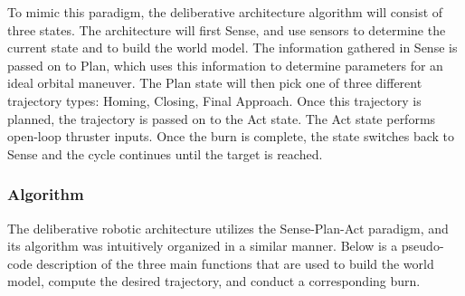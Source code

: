\documentclass[journal, 10pt]{IEEEtran}
\begin{document}
To mimic this paradigm, the deliberative architecture algorithm will consist of three states. The architecture will first Sense, and use sensors to determine the current state and to build the world model. The information gathered in Sense is passed on to Plan, which uses this information to determine parameters for an ideal orbital maneuver. The Plan state will then pick one of three different trajectory types: Homing, Closing, Final Approach. Once this trajectory is planned, the trajectory is passed on to the Act state. The Act state performs open-loop thruster inputs. Once the burn is complete, the state switches back to Sense and the cycle continues until the target is reached.

\subsubsection{Algorithm}
The deliberative robotic architecture utilizes the Sense-Plan-Act paradigm, and its algorithm was intuitively organized in a similar manner. Below is a pseudo-code description of the three main functions that are used to build the world model, compute the desired trajectory, and conduct a corresponding burn. 
\end{document}
